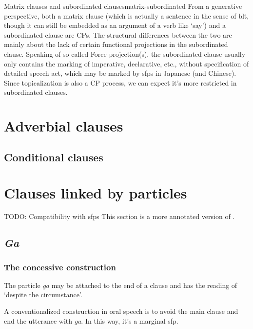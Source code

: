 \documentclass[UTF8, a4paper, oneside, scheme=plain]{ctexrep}
\newcommand*{\citesec}[1]{\S~{#1}}
\newcommand{\corpus}[1]{\emph{#1}}
\newcommand{\translate}[1]{`#1'}
\begin{document}
\begin{theorybox}{Matrix clauses and subordinated clauses}{matrix-subordinated}
    From a generative perspective, both a matrix clause 
    (which is actually a sentence in the sense of \acs{blt}, 
    though it can still be embedded as an argument of a verb like \translate{say})
    and a subordinated clause are CPs.
    The structural differences between the two 
    are mainly about the lack of certain functional projections in the subordinated clause.
    Speaking of so-called Force projection(s),
    the subordinated clause usually only contains the marking of 
    imperative, declarative, etc.,
    without specification of detailed speech act,
    which may be marked by \ac{sfp}s in Japanese (and Chinese).
    Since topicalization is also a CP process,
    we can expect it's more restricted in subordinated clauses.
\end{theorybox}

\section{Adverbial clauses}

\subsection{Conditional clauses}

\section{Clauses linked by particles}\label{sec:particle-linking-clause}

TODO: Compatibility with \ac{sfp}s
This section is a more annotated version of \citet[\citesec{6.3}]{akiyama2012japanese}.

\subsection{\corpus{Ga}}

\subsubsection{The concessive construction}

The particle \corpus{ga} may be attached to the end of a clause 
and has the reading of \translate{despite the circumstance}.

A conventionalized construction in oral speech is to avoid the main clause 
and end the utterance with \corpus{ga}.
In this way, it's a marginal \ac{sfp}.
\end{document}
